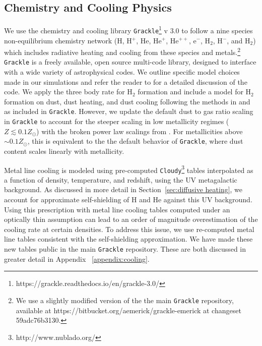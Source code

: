 \documentclass[twocolumn]{aastex61}
\begin{document}
\subsection{Chemistry and Cooling Physics}
\label{sec:chemistry}

We use the chemistry and cooling library \texttt{Grackle}\footnote{https://grackle.readthedocs.io/en/grackle-3.0/} v 3.0 to follow a nine species non-equilibrium chemistry network (H, H$^+$, He, He$^+$, He$^{++}$, e$^{-}$, H$_2$, H$^{-}$, and H$_{2}$) which includes radiative heating and cooling from these species and metals.\footnote{We use a slightly modified version of the the main \texttt{Grackle} repository, available at https://bitbucket.org/aemerick/grackle-emerick at changeset 59adc76b3130.} \texttt{Grackle} is a freely available, open source multi-code library, designed to interface with a wide variety of astrophysical codes. We outline specific model choices made in our simulations and refer the reader to \citep{GrackleMethod} for a detailed discussion of the code. We apply the \citet{Glover2008} three body rate for H$_{2}$ formation and include a model for H$_2$ formation on dust, dust heating, and dust cooling following the methods in \citet{2000ApJ...534..809O} and \citet{2005ApJ...626..627O} as included in \texttt{Grackle}. However, we update the default dust to gas ratio scaling in \texttt{Grackle} to account for the steeper scaling in low metallicity regimes ($Z \lesssim 0.1 Z_{\odot}$) with the broken power law scalings from \citet{Remy-Ruyer2014}. For metallicities above $\sim 0.1 Z_{\odot}$, this is equivalent to the the default behavior of \texttt{Grackle}, where dust content scales linearly with metallicity.

Metal line cooling is modeled using pre-computed \texttt{Cloudy}\footnote{http://www.nublado.org/} tables interpolated as a function of density, temperature, and redshift, using the \citet{HM2012} UV metagalactic background. As discussed in more detail in Section~\ref{sec:diffusive heating}, we account for approximate self-shielding of H and He against this UV background. Using this prescription with metal line cooling tables computed under an optically thin assumption can lead to an order of magnitude overestimation of the cooling rate at certain densities. To address this issue, we use re-computed metal line tables consistent with the self-shielding approximation.  We have made these new tables public in the main \texttt{Grackle} repository. These are both discussed in greater detail in Appendix ~\ref{appendix:cooling}.
\end{document}
